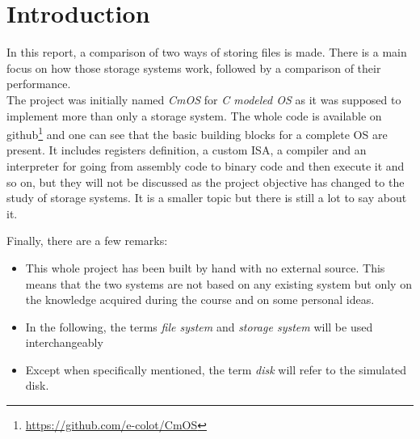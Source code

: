 \documentclass[10pt,a4paper]{ULBreport}
\begin{document}
 





\chapter{Introduction}

In this report, a comparison of two ways of storing files is made. There is a main focus on how those storage systems work, followed by a comparison of their performance. \\

The project was initially named \textit{CmOS} for \textit{C modeled OS} as it was supposed to implement more than only a storage system. The whole code is available on github\footnote{\href{https://github.com/e-colot/CmOS}{https://github.com/e-colot/CmOS}} and one can see that the basic building blocks for a complete OS are present. It includes registers definition, a custom ISA, a compiler and an interpreter for going from assembly code to binary code and then execute it and so on, but they will not be discussed as the project objective has changed to the study of storage systems. It is a smaller topic but there is still a lot to say about it. 

Finally, there are a few remarks:
\begin{itemize}
    \item This whole project has been built by hand with no external source. This means that the two systems are not based on any existing system but only on the knowledge acquired during the course and on some personal ideas.
    \item In the following, the terms \textit{file system} and \textit{storage system} will be used interchangeably
    \item Except when specifically mentioned, the term \textit{disk} will refer to the simulated disk.
\end{itemize}
\end{document}
